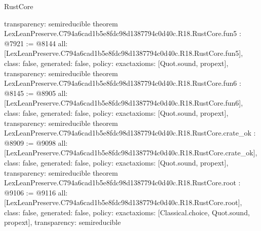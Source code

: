 \begin{lexlean}{RustCore}
\begin{coremodule}
{  transparency: semireducible
}
theorem LexLeanPreserve.C794a6cad1b5e8fdc98d1387794c0d40c.R18.RustCore.fun5 : @7921 := @8144 {
  all: [LexLeanPreserve.C794a6cad1b5e8fdc98d1387794c0d40c.R18.RustCore.fun5],
  class: false,
  generated: false,
  policy: exact{axioms: [Quot.sound, propext]},
  transparency: semireducible
}
theorem LexLeanPreserve.C794a6cad1b5e8fdc98d1387794c0d40c.R18.RustCore.fun6 : @8145 := @8905 {
  all: [LexLeanPreserve.C794a6cad1b5e8fdc98d1387794c0d40c.R18.RustCore.fun6],
  class: false,
  generated: false,
  policy: exact{axioms: [Quot.sound, propext]},
  transparency: semireducible
}
theorem LexLeanPreserve.C794a6cad1b5e8fdc98d1387794c0d40c.R18.RustCore.crate_ok : @8909 := @9098 {
  all: [LexLeanPreserve.C794a6cad1b5e8fdc98d1387794c0d40c.R18.RustCore.crate_ok],
  class: false,
  generated: false,
  policy: exact{axioms: [Quot.sound, propext]},
  transparency: semireducible
}
theorem LexLeanPreserve.C794a6cad1b5e8fdc98d1387794c0d40c.R18.RustCore.root : @9106 := @9116 {
  all: [LexLeanPreserve.C794a6cad1b5e8fdc98d1387794c0d40c.R18.RustCore.root],
  class: false,
  generated: false,
  policy: exact{axioms: [Classical.choice, Quot.sound, propext]},
  transparency: semireducible
}


\end{coremodule}
\end{lexlean}
